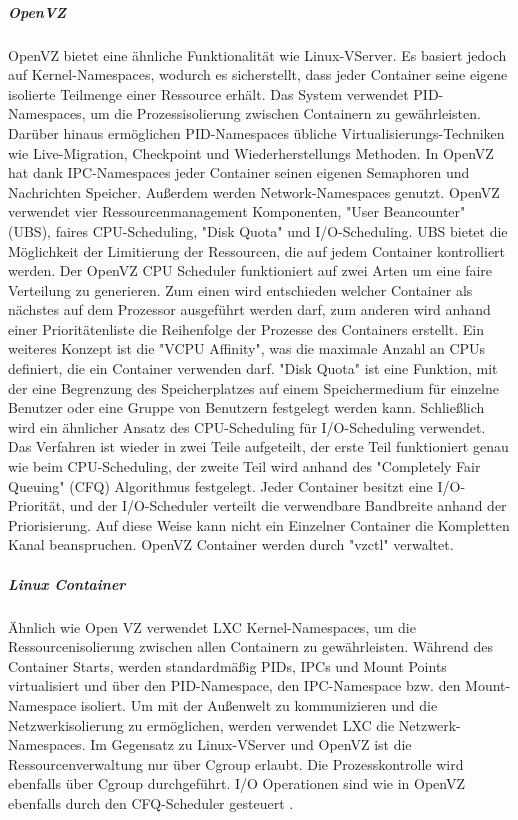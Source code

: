 \subparagraph{OpenVZ}
OpenVZ bietet eine ähnliche Funktionalität wie Linux-VServer. Es basiert jedoch auf Kernel-Namespaces, wodurch es sicherstellt, dass jeder Container seine eigene isolierte Teilmenge einer Ressource erhält. Das System verwendet PID-Namespaces, um die Prozessisolierung zwischen Containern zu gewährleisten. Darüber hinaus ermöglichen PID-Namespaces übliche Virtualisierungs-Techniken wie Live-Migration, Checkpoint und Wiederherstellungs Methoden. In OpenVZ hat dank IPC-Namespaces jeder Container seinen eigenen Semaphoren und Nachrichten Speicher. Außerdem werden Network-Namespaces genutzt. OpenVZ verwendet vier Ressourcenmanagement Komponenten, "User Beancounter" (UBS), faires CPU-Scheduling, "Disk Quota" und I/O-Scheduling. UBS bietet die Möglichkeit der Limitierung der Ressourcen, die auf jedem Container kontrolliert werden. Der OpenVZ CPU Scheduler funktioniert auf zwei Arten um eine faire Verteilung zu generieren. Zum einen wird entschieden welcher Container als nächstes auf dem Prozessor ausgeführt werden darf, zum anderen wird anhand einer Prioritätenliste die Reihenfolge der Prozesse des Containers erstellt. Ein weiteres Konzept ist die "VCPU Affinity", was die maximale Anzahl an CPUs definiert, die ein Container verwenden darf. "Disk Quota" ist eine Funktion, mit der eine Begrenzung des Speicherplatzes auf einem Speichermedium für einzelne Benutzer oder eine Gruppe von Benutzern festgelegt werden kann. Schließlich wird ein ähnlicher Ansatz des CPU-Scheduling für I/O-Scheduling verwendet. Das Verfahren ist wieder in zwei Teile aufgeteilt, der erste Teil funktioniert genau wie beim CPU-Scheduling, der zweite Teil wird anhand des "Completely Fair Queuing" (CFQ) Algorithmus festgelegt. Jeder Container besitzt eine I/O-Priorität, und der I/O-Scheduler verteilt die verwendbare Bandbreite anhand der Priorisierung. Auf diese Weise kann nicht ein Einzelner Container die Kompletten Kanal beanspruchen. OpenVZ Container werden durch "vzctl"\cite{ParallelsIPHoldingsGMbH2018Vzctl} verwaltet\cite{IndexOpenvz.org}\cite{Xavier2015AClouds}.

\subparagraph{Linux Container}
Ähnlich wie Open VZ verwendet LXC Kernel-Namespaces, um die Ressourcenisolierung zwischen allen Containern zu gewährleisten. Während des Container Starts, werden standardmäßig PIDs, IPCs und Mount Points virtualisiert und über den PID-Namespace, den IPC-Namespace bzw. den Mount-Namespace isoliert. Um mit der Außenwelt zu kommunizieren und die Netzwerkisolierung zu ermöglichen, werden verwendet LXC die Netzwerk-Namespaces. Im Gegensatz zu Linux-VServer und OpenVZ ist die Ressourcenverwaltung nur über Cgroup erlaubt. Die Prozesskontrolle wird ebenfalls über Cgroup durchgeführt. I/O Operationen sind wie in OpenVZ ebenfalls durch den CFQ-Scheduler gesteuert \cite{IndexLinuxcontainers.Org} \cite{Xavier2015AClouds}.

